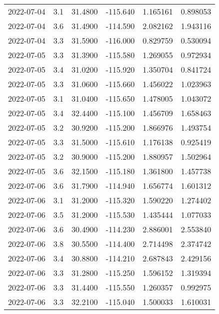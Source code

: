\begin{tabular}{lrrrrr}
2022-07-04 &       3.1 &  31.4800 &  -115.640 &         1.165161 &         0.898053 \\
2022-07-04 &       3.6 &  31.4900 &  -114.590 &         2.082162 &         1.943116 \\
2022-07-04 &       3.3 &  31.5900 &  -116.000 &         0.829759 &         0.530094 \\
2022-07-05 &       3.3 &  31.3900 &  -115.580 &         1.269055 &         0.972934 \\
2022-07-05 &       3.4 &  31.0200 &  -115.920 &         1.350704 &         0.841724 \\
2022-07-05 &       3.3 &  31.0600 &  -115.660 &         1.456022 &         1.023963 \\
2022-07-05 &       3.1 &  31.0400 &  -115.650 &         1.478005 &         1.043072 \\
2022-07-05 &       3.4 &  32.4400 &  -115.100 &         1.456709 &         1.658463 \\
2022-07-05 &       3.2 &  30.9200 &  -115.200 &         1.866976 &         1.493754 \\
2022-07-05 &       3.3 &  31.5000 &  -115.610 &         1.176138 &         0.925419 \\
2022-07-05 &       3.2 &  30.9000 &  -115.200 &         1.880957 &         1.502964 \\
2022-07-05 &       3.6 &  32.1500 &  -115.180 &         1.361800 &         1.457738 \\
2022-07-06 &       3.6 &  31.7900 &  -114.940 &         1.656774 &         1.601312 \\
2022-07-06 &       3.1 &  31.2000 &  -115.320 &         1.590220 &         1.274402 \\
2022-07-06 &       3.5 &  31.2000 &  -115.530 &         1.435444 &         1.077033 \\
2022-07-06 &       3.6 &  30.4900 &  -114.230 &         2.886001 &         2.553840 \\
2022-07-06 &       3.8 &  30.5500 &  -114.400 &         2.714498 &         2.374742 \\
2022-07-06 &       3.4 &  30.8800 &  -114.210 &         2.687843 &         2.429156 \\
2022-07-06 &       3.3 &  31.2800 &  -115.250 &         1.596152 &         1.319394 \\
2022-07-06 &       3.3 &  31.4400 &  -115.550 &         1.260357 &         0.992975 \\
2022-07-06 &       3.3 &  32.2100 &  -115.040 &         1.500033 &         1.610031 \\

\end{tabular}
